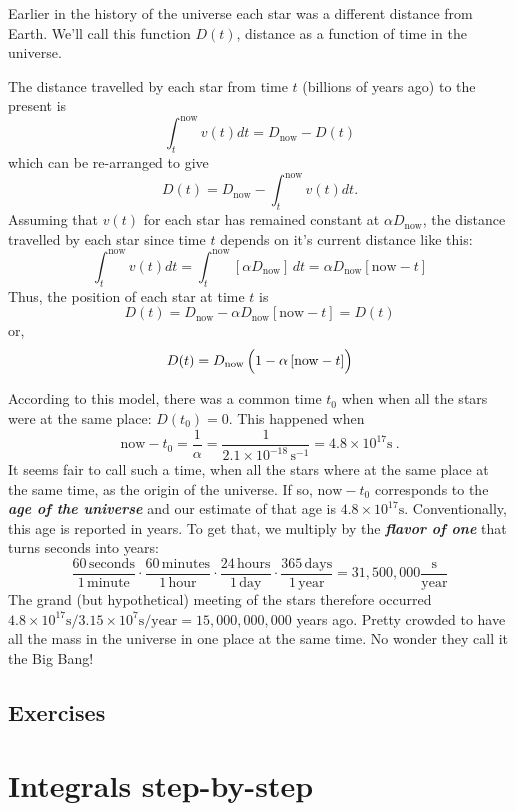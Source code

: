\documentclass[
  letterpaper,
  DIV=11,
  numbers=noendperiod,
  oneside]{scrreprt}
\begin{document}
Earlier in the history of the universe each star was a different
distance from Earth. We'll call this function \(D(t)\), distance as a
function of time in the universe.

The distance travelled by each star from time \(t\) (billions of years
ago) to the present is
\[\int_t^\text{now} v(t) dt  = D_\text{now} - D(t)\] which can be
re-arranged to give
\[D(t) = D_\text{now} - \int_t^\text{now} v(t) dt .\] Assuming that
\(v(t)\) for each star has remained constant at \(\alpha D_\text{now}\),
the distance travelled by each star since time \(t\) depends on it's
current distance like this:
\[\int_t^\text{now} v(t) dt = \int_t^\text{now} \left[ \alpha D_\text{now}\right]\, dt = \alpha D_\text{now}\left[\text{now} - t\right]\]
Thus, the position of each star at time \(t\) is
\[D(t) = D_\text{now} - \alpha D_\text{now}\left[\text{now} - t\right] = D(t)\]
or,
\[D(t) = D_\text{now}\left({\large\strut} 1-\alpha \left[\text{now} - t\right]\right)\]

According to this model, there was a common time \(t_0\) when when all
the stars were at the same place: \(D(t_0) = 0\). This happened when
\[\text{now} - t_0 = \frac{1}{\alpha} = \frac{1}{2.1 \times 10^{-18}\, \text{s}^{-1}} = 4.8 \times 10^{17} \text{s}\ .\]
It seems fair to call such a time, when all the stars where at the same
place at the same time, as the origin of the universe. If so,
\(\text{now} - t_0\) corresponds to the \textbf{\emph{age of the
universe}} and our estimate of that age is
\(4.8\times 10^{17}\text{s}\). Conventionally, this age is reported in
years. To get that, we multiply by the \textbf{\emph{flavor of one}}
that turns seconds into years:
\[\frac{60\, \text{seconds}}{1\, \text{minute}} \cdot \frac{60\, \text{minutes}}{1\, \text{hour}} \cdot \frac{24\, \text{hours}}{1\, \text{day}} \cdot \frac{365\, \text{days}}{1\, \text{year}} = 31,500,000 \frac{\text{s}}{\text{year}}\]
The grand (but hypothetical) meeting of the stars therefore occurred
\(4.8 \times 10^{17} \text{s} / 3.15 \times 10^{7} \text{s/year} = 15,000,000,000\)
years ago. Pretty crowded to have all the mass in the universe in one
place at the same time. No wonder they call it the Big Bang!

\hypertarget{exercises-2}{%
\section{Exercises}\label{exercises-2}}

\hypertarget{integrals-step-by-step}{%
\chapter{Integrals step-by-step}\label{integrals-step-by-step}}
\end{document}
